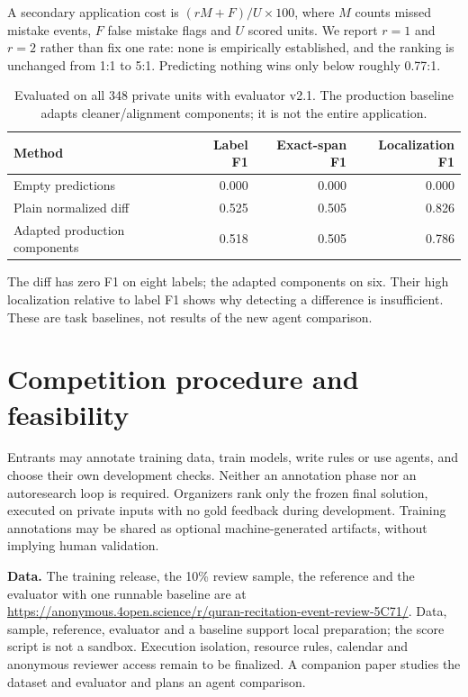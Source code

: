 \documentclass{article}
\begin{document}
A secondary application cost is $(rM+F)/U\times100$, where $M$ counts missed mistake events, $F$ false mistake flags and $U$ scored units. We report $r=1$ and $r=2$ rather than fix one rate: none is empirically established, and the ranking is unchanged from 1:1 to 5:1. Predicting nothing wins only below roughly 0.77:1.

\begin{table}[h]\centering\small
\begin{tabular}{lrrr}\toprule
Method & Label F1 & Exact-span F1 & Localization F1\\\midrule
Empty predictions & 0.000 & 0.000 & 0.000\\
Plain normalized diff & 0.525 & 0.505 & 0.826\\
Adapted production components & 0.518 & 0.505 & 0.786\\\bottomrule
\end{tabular}
\caption{Evaluated on all 348 private units with evaluator v2.1. The production baseline adapts cleaner/alignment components; it is not the entire application.}
\end{table}

The diff has zero F1 on eight labels; the adapted components on six. Their high localization relative to label F1 shows why detecting a difference is insufficient. These are task baselines, not results of the new agent comparison.

\section{Competition procedure and feasibility}
Entrants may annotate training data, train models, write rules or use agents, and choose their own development checks. Neither an annotation phase nor an autoresearch loop is required. Organizers rank only the frozen final solution, executed on private inputs with no gold feedback during development. Training annotations may be shared as optional machine-generated artifacts, without implying human validation.

\textbf{Data.} The training release, the 10\% review sample, the reference and the evaluator with one runnable baseline are at \url{https://anonymous.4open.science/r/quran-recitation-event-review-5C71/}. Data, sample, reference, evaluator and a baseline support local preparation; the score script is not a sandbox. Execution isolation, resource rules, calendar and anonymous reviewer access remain to be finalized. A companion paper studies the dataset and evaluator and plans an agent comparison.
\end{document}
